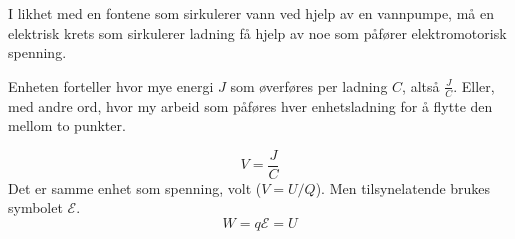 I likhet med en fontene som sirkulerer vann ved hjelp av en vannpumpe,
må en elektrisk krets som sirkulerer ladning få hjelp av noe som påfører
elektromotorisk spenning.

Enheten forteller hvor mye energi $J$ som øverføres per ladning $C$,
altså $\frac{J}{C}$.
Eller, med andre ord, hvor my arbeid som påføres hver enhetsladning
for å flytte den mellom to punkter.

$$V = \frac{J}{C}$$
Det er samme enhet som spenning, volt ($V = U/Q$).
Men tilsynelatende brukes symbolet $\mathcal{E}$.
$$W = q\mathcal{E} = U$$
